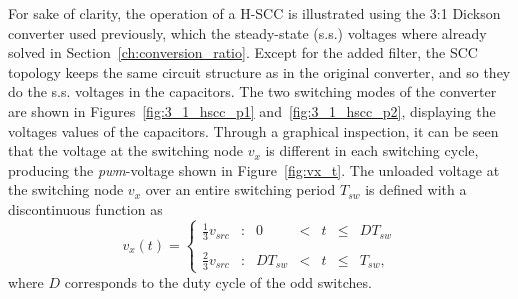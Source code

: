 For sake of clarity, the operation of a H-SCC is illustrated using the 3:1 Dickson converter used previously, which the steady-state (s.s.) voltages where already solved in Section~\ref{ch:conversion_ratio}. Except for the added filter, the SCC topology keeps the same circuit structure as in the original converter, and so they do the s.s. voltages in the capacitors. The two switching modes of the converter are shown in Figures~\ref{fig:3_1_hscc_p1} and~\ref{fig:3_1_hscc_p2}, displaying the voltages values of the capacitors. Through a graphical inspection, it can be seen that the voltage at the switching node $v_x$ is different in each switching cycle, producing the \emph{pwm}-voltage shown in Figure~\ref{fig:vx_t}. The unloaded voltage at the switching node $v_x$ over an entire switching period $T_{sw}$ is defined with a discontinuous function as
\begin{equation}
v_x(t) = \left\{
\begin{array}{lcccccr}
  \frac{1}{3} v_{src}   & : & 0   & < & t & \leq & D  T_{sw}  \\
  ~\\
   \frac{2}{3} v_{src} & : & D T_{sw} & < & t & \leq & T_{sw},
\end{array}
\right.
\label{eq:vx_t}
\end{equation}
where $D$ corresponds to the duty cycle of the odd switches.
